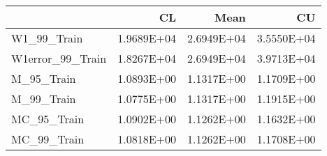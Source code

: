 \begin{tabular}{lrrr}
\toprule
{} &         CL &       Mean &         CU \\
\midrule
W1\_99\_Train      & 1.9689E+04 & 2.6949E+04 & 3.5550E+04 \\
W1error\_99\_Train & 1.8267E+04 & 2.6949E+04 & 3.9713E+04 \\
M\_95\_Train       & 1.0893E+00 & 1.1317E+00 & 1.1709E+00 \\
M\_99\_Train       & 1.0775E+00 & 1.1317E+00 & 1.1915E+00 \\
MC\_95\_Train      & 1.0902E+00 & 1.1262E+00 & 1.1632E+00 \\
MC\_99\_Train      & 1.0818E+00 & 1.1262E+00 & 1.1708E+00 \\
\bottomrule
\end{tabular}
